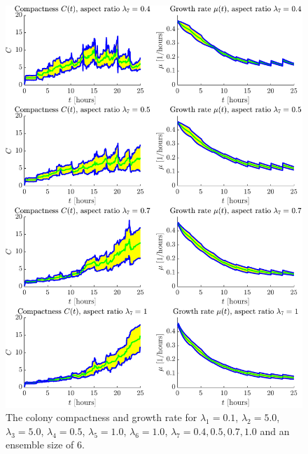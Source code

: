 \begin{figure}[!htb]
    \centering
    \includegraphics[width= \textwidth]{
        chapter3/figures/Comp_all_ar_EnsembleSize_6o0_L1_0o10_L2_5o00_L3_5o00_L4_0o50_L5_1o00_L6_1o00_L7_0o40.pdf}
    \caption{The colony compactness and growth rate for 
             $\lambda_1 = 0.1$,  
             $\lambda_2 = 5.0$, 
             $\lambda_3 = 5.0$, 
             $\lambda_4 = 0.5$, 
             $\lambda_5 = 1.0$, 
             $\lambda_6 = 1.0$, 
             $\lambda_7 = 0.4, 0.5, 0.7, 1.0$ and an ensemble size of $6$.}
    \label{fig:compactnessAndMu_varyAR}
\end{figure}

